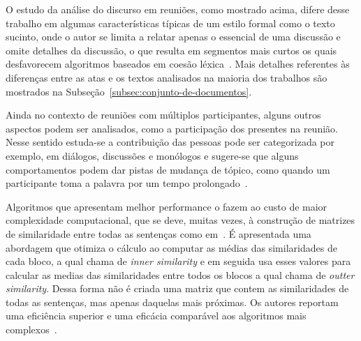 

O estudo da análise do discurso em reuniões, como mostrado acima, difere desse trabalho em algumas características típicas de um estilo formal como o texto sucinto, onde o autor se limita a relatar apenas o essencial de uma discussão e omite detalhes da discussão, o que resulta em segmentos mais curtos os quais desfavorecem algoritmos baseados em coesão léxica~\cite{Choi2000}. Mais detalhes referentes às diferenças entre as atas e os textos analisados na maioria dos trabalhos são mostrados na Subseção~\ref{subsec:conjunto-de-documentos}.


Ainda no contexto de reuniões com múltiplos participantes, alguns outros aspectos podem ser analisados, como a participação dos presentes na reunião. Nesse sentido estuda-se a contribuição das pessoas pode ser categorizada  por exemplo, em diálogos, discussões e monólogos e sugere-se que alguns comportamentos podem dar pistas de mudança de tópico, como quando um participante toma a palavra por um tempo prolongado~\cite{Bokaei2015}. 

%



Algoritmos que apresentam melhor performance o fazem ao custo de maior complexidade computacional, que se deve, muitas vezes, à construção de matrizes de similaridade entre todas as sentenças como em~\cite{Choi2000}. É apresentada uma abordagem que otimiza o cálculo ao computar as médias das similaridades de cada bloco, a qual chama de \textit{inner similarity} e em seguida usa esses valores para calcular as medias das similaridades entre todos os blocos a qual chama de \textit{outter similarity}. Dessa forma não é criada uma matriz que contem as similaridades de todas as sentenças, mas apenas daquelas mais próximas. Os autores reportam uma eficiência superior e uma eficácia comparável aos algoritmos mais complexos~\cite{Kern2009}.









